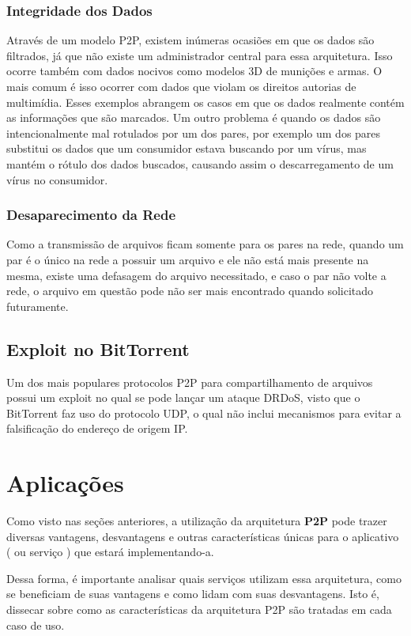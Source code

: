 \documentclass[a4paper]{article}
\begin{document}
\subsubsection{Integridade dos Dados}
Através de um modelo P2P, existem inúmeras ocasiões em que os dados são filtrados, já que não existe um administrador central para essa arquitetura. Isso ocorre também com dados nocivos como modelos 3D de munições e armas. O mais comum é isso ocorrer com dados que violam os direitos autorias de multimídia. Esses exemplos abrangem os casos em que os dados realmente contém as informações que são marcados. Um outro problema é quando os dados são intencionalmente mal rotulados por um dos pares, por exemplo um dos pares substitui os dados que um consumidor estava buscando por um vírus, mas mantém o rótulo dos dados buscados, causando assim o descarregamento de um vírus no consumidor.

\subsubsection{Desaparecimento da Rede}
Como a transmissão de arquivos ficam somente para os pares na rede, quando um par é o único na rede a possuir um arquivo e ele não está mais presente na mesma, existe uma defasagem do arquivo necessitado, e caso o par não volte a rede, o arquivo em questão pode não ser mais encontrado quando solicitado futuramente.

\subsection{Exploit no BitTorrent}
Um dos mais populares protocolos P2P para compartilhamento de arquivos possui um exploit no qual se pode lançar um ataque DRDoS, visto que o BitTorrent faz uso do protocolo UDP, o qual não inclui mecanismos para evitar a falsificação do endereço de origem IP.\cite{BitExploit}

\section{Aplicações}
Como visto nas seções anteriores, a utilização da arquitetura \textbf{P2P} pode trazer diversas vantagens, desvantagens e outras características únicas para o aplicativo ( ou serviço ) que estará implementando-a. 

Dessa forma, é importante analisar quais serviços utilizam essa arquitetura, como se beneficiam de suas vantagens e como lidam com suas desvantagens. Isto é, dissecar sobre como as características da arquitetura P2P são tratadas em cada caso de uso.
\end{document}
